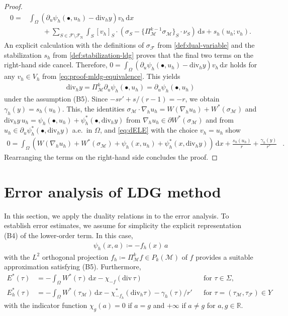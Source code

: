 \documentclass[a4paper]{amsart}
\numberwithin{equation}{section}
\renewcommand{\d}[1]{\,\mathrm{d}#1}
\renewcommand{\div}{\mathrm{div}}
\newcommand{\Mcal}{\mathcal{M}}
\theoremstyle{remark}
\begin{document}
\begin{proof}
\begin{align}
		0 = &\int_\Omega (\partial_u \psi_h(\bullet, u_h) - \div_h y) v_h \d{x}\nonumber\\
		&\qquad + \sum_{S \in \mathcal{F} \setminus \mathcal{F}_\mathrm{N}} \int_S [v_h]_S \cdot (\sigma_S - \{\Pi_\Mcal^{k-1} \sigma_\Mcal\}_S \cdot \nu_S) \d{s} + s_h(u_h;v_h).
	\end{align}
	An explicit calculation with
	the definitions of $\sigma_\mathcal{F}$ from \eqref{def:dual-variable} and the stabilization $s_h$ from \eqref{def:stabilization-ldg} proves that the final two terms on the right-hand side cancel. Therefore, $0 = \int_\Omega (\partial_u \psi_h(\bullet, u_h) - \div_h y) v_h \d{x}$ holds for any $v_h \in V_h$ from \eqref{eq:proof-mldg-equivalence}. This yields
	\begin{align}\label{eq:div_h_sigma_h}
		\div_h y = \Pi_\Mcal^k \partial_u \psi_h(\bullet,u_h) = \partial_u \psi_h(\bullet,u_h)
	\end{align}
	under the assumption (B5).
	Since $-sr' + s/(r-1) = -r$, we obtain $\gamma_h(y) = s_h(u_h)$.
	This, the identities $\sigma_\Mcal \cdot \nabla_h u_h = W(\nabla_h u_h) + W^*(\sigma_\Mcal)$ and $\div_h y\,u_h = \psi_h(\bullet,u_h) + \psi_h^*(\bullet,\div_h y)$ from $\nabla_h u_h \in \partial W^*(\sigma_\Mcal)$ and from $u_h \in \partial_u \psi_h^*(\bullet,\div_h y)$ a.e.~in $\Omega$, and \eqref{eq:dELE} with the choice $v_h = u_h$ show
	\begin{align*}
		0 = \int_\Omega (W(\nabla_h u_h) + W^*(\sigma_\Mcal) + \psi_h(x,u_h) + \psi_h^*(x,\div_h y)) \d{x} + \frac{s_h(u_h)}{r} + \frac{\gamma_h(y)}{r'}&.
	\end{align*}
	Rearranging the terms on the right-hand side concludes the proof. 
\end{proof}

\section{Error analysis of LDG method}\label{sec:error-analysis}
In this section, we apply the duality relations in  to the error analysis. To establish error estimates, we assume for simplicity the explicit representation (B4) of the lower-order term. In this case,
\begin{align}\label{def:lower-order-terms}
	\psi_h(x,a) \coloneqq -f_h(x)\, a
\end{align}
with the $L^2$ orthogonal projection $f_h \coloneqq \Pi_\Mcal^{k} f \in P_{k}(\Mcal)$ of $f$ provides a suitable approximation satisfying (B5). Furthermore,
\begin{align*}
	E^*(\tau) &= -\int_\Omega W^*(\tau) \d{x} - \chi_{-f} (\div\,\tau) &&\text{for } \tau \in \Sigma,\\
	E^*_h(\tau) &= - \int_\Omega W^*(\tau_\Mcal) \d{x} - \chi_{-f_h}^*(\div_h \tau) - \gamma_h(\tau)/r' &&\text{for } \tau = (\tau_\Mcal, \tau_\mathcal{F}) \in Y
\end{align*}
with the indicator function $\chi_{g}(a) = 0$ if $a = g$ and $+\infty$ if $a \neq g$ for $a,g \in \mathbb{R}$.
\end{document}
